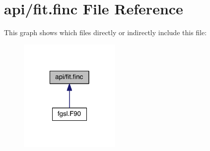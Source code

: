 \hypertarget{fit_8finc}{\section{api/fit.finc File Reference}
\label{fit_8finc}
}
This graph shows which files directly or indirectly include this file\-:\nopagebreak
\begin{figure}[H]
\begin{center}
\leavevmode
\includegraphics[width=138pt]{fit_8finc__dep__incl}
\end{center}
\end{figure}
